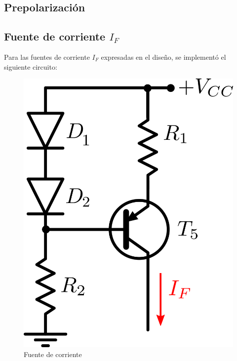 \subsection{Prepolarización}


\subsection{Fuente de corriente $I_F$}

Para las fuentes de corriente $I_F$ expresadas en el diseño, se implementó el siguiente circuito:

\begin{figure}[!ht]
\begin{centering}
\includegraphics[scale=0.5]{Imagenes/FuenteIF.png}
\par\end{centering}
\caption{Fuente de corriente}
\end{figure}

